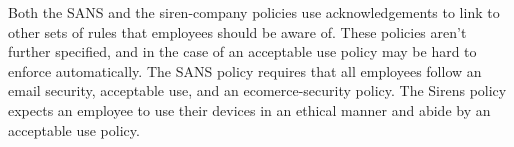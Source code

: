\documentclass{llncs}
\newenvironment{policyrule}[1]{%
  \begin{mdframed}\footnotesize
      \noindent\textbf{\sffamily #1}:~\itshape%
}{%
  \end{mdframed}
}
\begin{document}

Both the SANS and the siren-company policies use acknowledgements to link to other sets of rules that employees should be aware of.
These policies aren't further specified, and in the case of an acceptable use policy may be hard to enforce automatically.
The SANS policy requires that all employees follow an email security, acceptable use, and an ecomerce-security policy.
The Sirens policy expects an employee to use their devices in an ethical manner and abide by an acceptable use policy.
\end{document}
